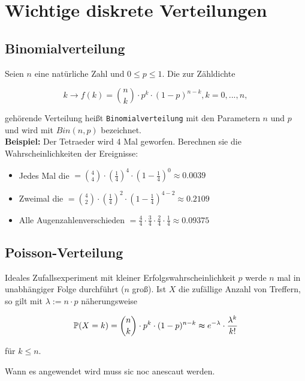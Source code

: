 

\section{Wichtige diskrete Verteilungen}

\subsection{Binomialverteilung}

Seien $n$ eine natürliche Zahl und $0\leq p\leq 1$. Die zur Zähldichte

\[k\longrightarrow f(k)=\binom{n}{k}\cdot p^k\cdot (1-p)^{n-k},k=0,...,n, \]

gehörende Verteilung heißt \texttt{Binomialverteilung} mit den Parametern $n$ und $p$ und wird mit $Bin(n,p)$ bezeichnet.\\

\textbf{Beispiel: } Der Tetraeder wird 4 Mal geworfen. Berechnen sie die Wahrscheinlichkeiten der Ereignisse:
\begin{itemize}
    \item Jedes Mal die \dq $=\binom{4}{4} \cdot (\frac{1}{4})^4\cdot (1-\frac{1}{4})^{0}\approx 0.0039$
    \item Zweimal die \dq $=\binom{4}{2} \cdot (\frac{1}{4})^2\cdot (1-\frac{1}{4})^{4-2}\approx 0.2109$
    \item Alle Augenzahlenverschieden $=\frac{4}{4}\cdot\frac{3}{4}\cdot \frac{2}{4}\cdot \frac{1}{4} \approx 0.09375$
\end{itemize}


\subsection{Poisson-Verteilung}

Ideales Zufallsexperiment mit kleiner Erfolgswahrscheinlichkeit $p$ werde $n$ mal in unabhängiger Folge durchführt ($n$ groß). Ist $X$ die zufällige Anzahl von Treffern, so gilt mit $\lambda := n\cdot p$ näherungsweise

\[\mathbb{P} (X=k) = \binom{n}{k}\cdot p^k \cdot (1-p)^{n-k}\thickapprox e^{-\lambda}\cdot \frac{\lambda^k}{k!}  \]

für $k\leq n$.

Wann es angewendet wird muss sic noc anescaut werden.

